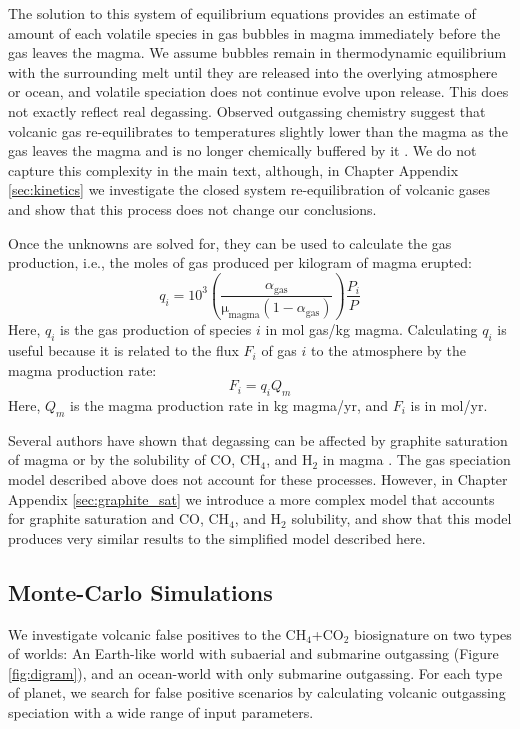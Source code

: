The solution to this system of equilibrium equations provides an estimate of amount of each volatile species in gas bubbles in magma immediately before the gas leaves the magma. We assume bubbles remain in thermodynamic equilibrium with the surrounding melt until they are released into the overlying atmosphere or ocean, and volatile speciation does not continue evolve upon release. This does not exactly reflect real degassing. Observed outgassing chemistry suggest that volcanic gas re-equilibrates to temperatures slightly lower than the magma as the gas leaves the magma and is no longer chemically buffered by it \citep{Moussallam_2019,Kadoya_2020,Oppenheimer_2018}. We do not capture this complexity in the main text, although, in Chapter Appendix \ref{sec:kinetics} we investigate the closed system re-equilibration of volcanic gases and show that this process does not change our conclusions.

Once the unknowns are solved for, they can be used to calculate the gas production, i.e., the moles of gas produced per kilogram of magma erupted:
\begin{equation}\label{eq:production}
    q_i = 10^3\left(\frac{\alpha_\mathrm{gas}}{\mathrm{\mu_\mathrm{magma}}(1-\alpha_\mathrm{gas})}\right) \frac{P_i}{P}
\end{equation}
Here, $q_i$ is the gas production of species $i$ in mol gas/kg magma. Calculating $q_i$ is useful because it is related to the flux $F_i$ of gas $i$ to the atmosphere by the magma production rate:
\begin{equation}\label{eq:Flux}
    F_i=q_iQ_{m}
\end{equation}
Here, $Q_m$ is the magma production rate in kg magma/yr, and $F_i$ is in mol/yr. 

Several authors have shown that degassing can be affected by graphite saturation of magma \citep{Hirschmann_2008} or by the solubility of CO, CH$_4$, and H$_2$ in magma \citep{Wetzel_2013,Ardia_2013,Hirschmann_2012}. The gas speciation model described above does not account for these processes. However, in Chapter Appendix \ref{sec:graphite_sat} we introduce a more complex model that accounts for graphite saturation and CO, CH$_4$, and H$_2$ solubility, and show that this model produces very similar results to the simplified model described here.

\subsection{Monte-Carlo Simulations}\label{sec:monte}
We investigate volcanic false positives to the CH$_4$+CO$_2$ biosignature on two types of worlds: An Earth-like world with subaerial and submarine outgassing (Figure \ref{fig:digram}), and an ocean-world with only submarine outgassing. For each type of planet, we search for false positive scenarios by calculating volcanic outgassing speciation with a wide range of input parameters.

